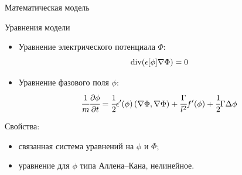 \begin{frame}{Математическая модель}
\vspace{-0.5cm}
\begin{block}{Уравнения модели}
\begin{itemize}
	\item Уравнение электрического потенциала $\Phi$:
	\begin{equation}
		\operatorname{{div}}(\epsilon[\phi] \nabla \Phi) = 0
		\label{equation_potential}
	\end{equation}
	\item Уравнение фазового поля $\phi$:
	\begin{equation}
		\cfrac{1}{m} \cfrac{\partial \phi}{\partial t} = \cfrac{1}{2} \epsilon'(\phi) \left( \nabla \Phi, \nabla \Phi \right) + \cfrac{\Gamma}{l^2} f'(\phi) + \cfrac{1}{2} \Gamma \Delta \phi
		\label{equation_phase}
	\end{equation}
\end{itemize}
\end{block}
Свойства:
\begin{itemize}
	\item связанная система уравнений на $\phi$ и $\Phi$;
	\item уравнение для $\phi$ типа Аллена--Кана, нелинейное.
\end{itemize}
\end{frame}


